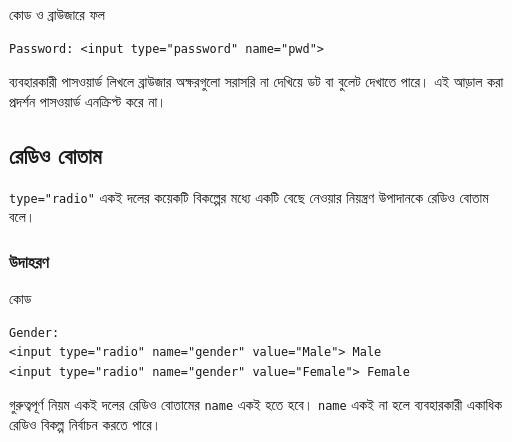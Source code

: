 \begin{chFourWholeExample}{কোড ও ব্রাউজারে ফল}
\noindent
\begin{minipage}[t]{.50\linewidth}\vspace{0pt}

\begin{verbatim}
Password: <input type="password" name="pwd">
\end{verbatim}

\end{minipage}\hfill
\begin{minipage}[t]{.46\linewidth}\vspace{0pt}
ব্যবহারকারী পাসওয়ার্ড লিখলে ব্রাউজার অক্ষরগুলো সরাসরি না দেখিয়ে ডট বা বুলেট দেখাতে পারে। এই আড়াল করা প্রদর্শন পাসওয়ার্ড এনক্রিপ্ট করে না।
\end{minipage}
\end{chFourWholeExample}

\subsection{রেডিও বোতাম}

\begin{definitionbox}{\texttt{type="radio"}}
একই দলের কয়েকটি বিকল্পের মধ্যে একটি বেছে নেওয়ার নিয়ন্ত্রণ উপাদানকে রেডিও বোতাম বলে।
\end{definitionbox}

\subsubsection{উদাহরণ}

\begin{examplebox}{কোড}
\par\noindent\begin{minipage}{\linewidth}
\begin{verbatim}
Gender:
<input type="radio" name="gender" value="Male"> Male
<input type="radio" name="gender" value="Female"> Female
\end{verbatim}
\end{minipage}\par
\end{examplebox}

\begin{keypointbox}{গুরুত্বপূর্ণ নিয়ম}
একই দলের রেডিও বোতামের \texttt{name} একই হতে হবে। \texttt{name} একই না হলে ব্যবহারকারী একাধিক রেডিও বিকল্প নির্বাচন করতে পারে।
\end{keypointbox}

